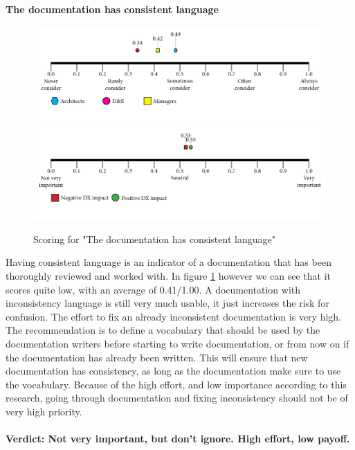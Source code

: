     \paragraph{The documentation has consistent language}
    \begin{figure}[H]
        \centering
        \includegraphics[width=\linewidth]{scorelines/aspect6.png}
        \includegraphics[width=\linewidth]{dxscorelines/dxaspect6.png}
        \caption{Scoring for "The documentation has consistent language"}
        \label{fig:aspect6}
    \end{figure}
    Having consistent language is an indicator of a documentation that has been thoroughly reviewed and worked with. In figure \ref{fig:aspect6} however we can see that it scores quite low, with an average of 0.41/1.00. A documentation with inconsistency language is still very much usable, it just increases the risk for confusion. The effort to fix an already inconsistent documentation is very high. The recommendation is to define a vocabulary that should be used by the documentation writers before starting to write documentation, or from now on if the documentation has already been written. This will ensure that new documentation has consistency, as long as the documentation make sure to use the vocabulary. Because of the high effort, and low importance according to this research, going through documentation and fixing inconsistency should not be of very high priority.\\ \\
    \textbf{Verdict: Not very important, but don't ignore. High effort, low payoff.}
